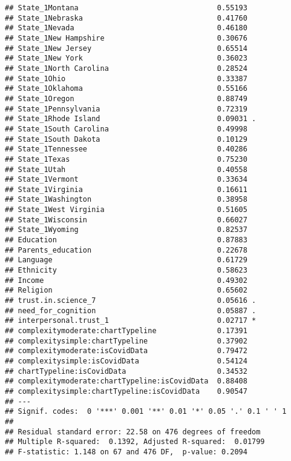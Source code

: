 \documentclass[
]{article}
\begin{document}
\begin{verbatim}
## State_1Montana                                0.55193   
## State_1Nebraska                               0.41760   
## State_1Nevada                                 0.46180   
## State_1New Hampshire                          0.30676   
## State_1New Jersey                             0.65514   
## State_1New York                               0.36023   
## State_1North Carolina                         0.28524   
## State_1Ohio                                   0.33387   
## State_1Oklahoma                               0.55166   
## State_1Oregon                                 0.88749   
## State_1Pennsylvania                           0.72319   
## State_1Rhode Island                           0.09031 . 
## State_1South Carolina                         0.49998   
## State_1South Dakota                           0.10129   
## State_1Tennessee                              0.40286   
## State_1Texas                                  0.75230   
## State_1Utah                                   0.40558   
## State_1Vermont                                0.33634   
## State_1Virginia                               0.16611   
## State_1Washington                             0.38958   
## State_1West Virginia                          0.51605   
## State_1Wisconsin                              0.66027   
## State_1Wyoming                                0.82537   
## Education                                     0.87883   
## Parents_education                             0.22678   
## Language                                      0.61729   
## Ethnicity                                     0.58623   
## Income                                        0.49302   
## Religion                                      0.65602   
## trust.in.science_7                            0.05616 . 
## need_for_cognition                            0.05887 . 
## interpersonal.trust_1                         0.02717 * 
## complexitymoderate:chartTypeline              0.17391   
## complexitysimple:chartTypeline                0.37902   
## complexitymoderate:isCovidData                0.79472   
## complexitysimple:isCovidData                  0.54124   
## chartTypeline:isCovidData                     0.34532   
## complexitymoderate:chartTypeline:isCovidData  0.88408   
## complexitysimple:chartTypeline:isCovidData    0.90547   
## ---
## Signif. codes:  0 '***' 0.001 '**' 0.01 '*' 0.05 '.' 0.1 ' ' 1
## 
## Residual standard error: 22.58 on 476 degrees of freedom
## Multiple R-squared:  0.1392, Adjusted R-squared:  0.01799 
## F-statistic: 1.148 on 67 and 476 DF,  p-value: 0.2094
\end{verbatim}
\end{document}
